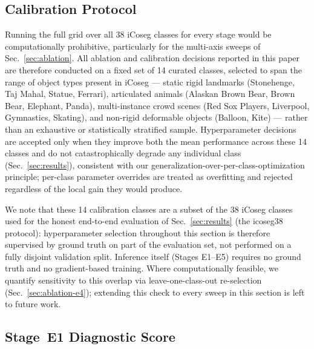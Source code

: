 \label{sec:ablation}
\label{sec:ablation-backbone}

\subsection{Calibration Protocol}
\label{sec:ablation-setup}

Running the full grid over all 38 iCoseg classes for every stage would
be computationally prohibitive, particularly for the multi-axis sweeps
of Sec.~\ref{sec:ablation}. All ablation and calibration decisions
reported in this paper are therefore conducted on a fixed set of 14
curated classes, selected to span the range of object types present in
iCoseg --- static rigid landmarks (Stonehenge, Taj Mahal, Statue,
Ferrari), articulated animals (Alaskan Brown Bear, Brown Bear, Elephant,
Panda), multi-instance crowd scenes (Red Sox Players, Liverpool,
Gymnastics, Skating), and non-rigid deformable objects (Balloon, Kite)
--- rather than an exhaustive or statistically stratified sample.
Hyperparameter decisions are accepted only when they improve both the
mean performance across these 14 classes and do not catastrophically
degrade any individual class (Sec.~\ref{sec:results}), consistent with
our generalization-over-per-class-optimization principle; per-class
parameter overrides are treated as overfitting and rejected regardless
of the local gain they would produce.

We note that these 14 calibration classes are a subset of the 38
iCoseg classes used for the honest end-to-end evaluation of
Sec.~\ref{sec:results} (the icoseg38 protocol): hyperparameter
selection throughout this section is therefore supervised by ground
truth on part of the evaluation set, not performed on a fully
disjoint validation split. Inference itself (Stages E1--E5) requires
no ground truth and no gradient-based training. Where computationally
feasible, we quantify sensitivity to this overlap via leave-one-class-out
re-selection (Sec.~\ref{sec:ablation-e4}); extending this check to every
sweep in this section is left to future work.

\subsection{Stage~E1 Diagnostic Score}
\label{sec:e1-diagnostics}

